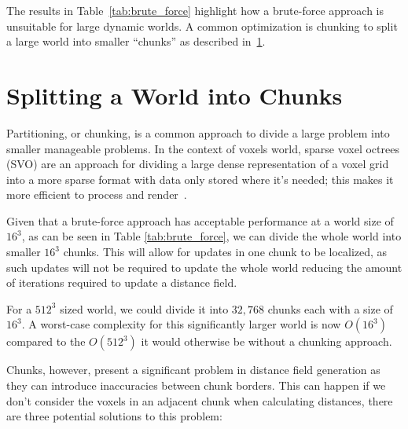 The results in Table~\ref{tab:brute_force} highlight how a brute-force approach is unsuitable for large dynamic worlds.
A common optimization is chunking to split a large world into smaller ``chunks'' as described in~\ref{sec:chunking}.

\section{Splitting a World into Chunks} \label{sec:chunking}
Partitioning, or chunking, is a common approach to divide a large problem into smaller manageable problems. In the
context of voxels world, sparse voxel octrees (SVO) are an approach for dividing a large dense representation of a voxel
grid into a more sparse format with data only stored where it's needed; this makes it more efficient to process and
render~\cite{laine2010efficient,mileff2019simplified,van2015real}.

Given that a brute-force approach has acceptable performance at a world size of \(16^3\), as can be seen in Table
\ref{tab:brute_force}, we can divide the whole world into smaller \(16^3\) chunks. This will allow for updates in one
chunk to be localized, as such updates will not be required to update the whole world reducing the amount of iterations
required to update a distance field.

For a \(512^3\) sized world, we could divide it into \(32,768\) chunks each with a size of \(16^3\). A worst-case
complexity for this significantly larger world is now \(O(16^3)\) compared to the \(O(512^3)\) it would otherwise be
without a chunking approach.

Chunks, however, present a significant problem in distance field generation as they can introduce inaccuracies between
chunk borders. This can happen if we don't consider the voxels in an adjacent chunk when calculating distances, there
are three potential solutions to this problem:

